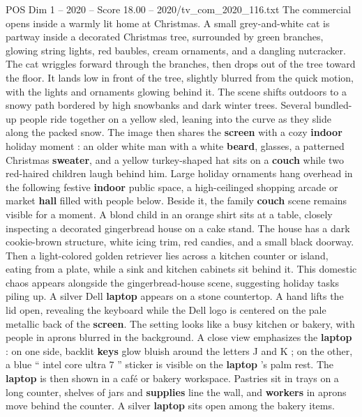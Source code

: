 \begin{textsample}{POS Dim 1 – 2020 – Score 18.00 – 2020/tv\_com\_2020\_116.txt}  \label{ex:f1_pos_006}
The commercial opens inside a warmly lit home at Christmas.
A small grey-and-white cat is partway inside a decorated Christmas tree, surrounded by green branches, glowing string lights, red baubles, cream ornaments, and a dangling nutcracker.
The cat wriggles forward through the branches, then drops out of the tree toward the floor.
It lands low in front of the tree, slightly blurred from the quick motion, with the lights and ornaments glowing behind it.
The scene shifts outdoors to a snowy path bordered by high snowbanks and dark winter trees.
Several bundled-up people ride together on a yellow sled, leaning into the curve as they slide along the packed snow.
The image then shares the \textbf{screen} with a cozy \textbf{indoor} holiday moment : an older white man with a white \textbf{beard}, glasses, a patterned Christmas \textbf{sweater}, and a yellow turkey-shaped hat sits on a \textbf{couch} while two red-haired children laugh behind him.
Large holiday ornaments hang overhead in the following festive \textbf{indoor} public space, a high-ceilinged shopping arcade or market \textbf{hall} filled with people below.
Beside it, the family \textbf{couch} scene remains visible for a moment.
A blond child in an orange shirt sits at a table, closely inspecting a decorated gingerbread house on a cake stand.
The house has a dark cookie-brown structure, white icing trim, red candies, and a small black doorway.
Then a light-colored golden retriever lies across a kitchen counter or island, eating from a plate, while a sink and kitchen cabinets sit behind it.
This domestic chaos appears alongside the gingerbread-house scene, suggesting holiday tasks piling up.
A silver Dell \textbf{laptop} appears on a stone countertop.
A hand lifts the lid open, revealing the keyboard while the Dell logo is centered on the pale metallic back of the \textbf{screen}.
The setting looks like a busy kitchen or bakery, with people in aprons blurred in the background.
A close view emphasizes the \textbf{laptop} : on one side, backlit \textbf{keys} glow bluish around the letters J and K ; on the other, a blue “ intel core ultra 7 ” sticker is visible on the \textbf{laptop} ’s palm rest.
The \textbf{laptop} is then shown in a café or bakery workspace.
Pastries sit in trays on a long counter, shelves of jars and \textbf{supplies} line the wall, and \textbf{workers} in aprons move behind the counter.
A silver \textbf{laptop} sits open among the bakery items.

\end{textsample}
